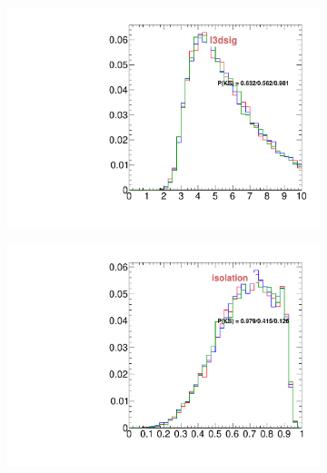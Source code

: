 \begin{figure}
\begin{subfigure}[b]{0.2\textwidth}
                \includegraphics[width=\textwidth]{Figures/VariablesComparison/Data_endcaps_figs_3h/l3dsig}
                \label{fig:Data_endcaps_l3dsig_3h}
        \end{subfigure}
        \begin{subfigure}[b]{0.2\textwidth}
                \centering
                \includegraphics[width=\textwidth]{Figures/VariablesComparison/Data_endcaps_figs_3h/isolation}
                \label{fig:Data_endcaps_isolation_3h}
        \end{subfigure}
        \begin{subfigure}[b]{0.2\textwidth}
                \centering

\end{subfigure}
\end{figure}
